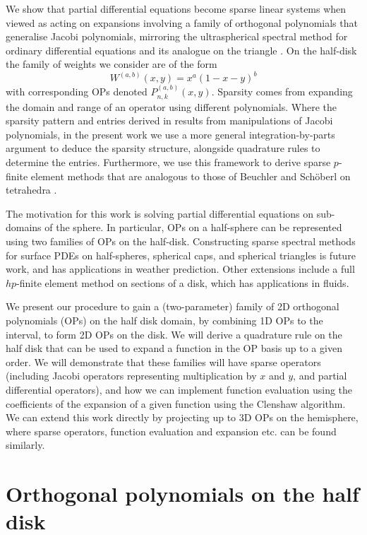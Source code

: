 \documentclass[11pt, oneside]{article}   	%
\begin{document}
We show that partial differential equations become sparse linear systems when viewed as acting on expansions involving a family of orthogonal polynomials that  generalise Jacobi polynomials, mirroring the ultraspherical spectral method for ordinary differential equations \cite{SOATUltraspherical} and its analogue on the triangle \cite{SOATGVTriangle}.  On the half-disk the family of weights we consider are of the form
$$
W^{(a,b)}(x,y) = x^a (1-x-y)^b
$$
with corresponding OPs denoted $P_{n,k}^{(a,b)}(x,y)$. Sparsity comes from expanding the domain and range of an operator  using different polynomials. Where the sparsity pattern and entries derived in \cite{SOATGVTriangleRecurrence,SOATGVTriangle}  results from manipulations of Jacobi polynomials, in the present work we use a more general integration-by-parts argument to deduce the sparsity structure, alongside quadrature rules to determine the entries.  Furthermore, we use this framework to derive sparse $p$-finite element methods that are analogous to those of Beuchler and Sch\"oberl on tetrahedra \cite{TriangleFEM}. 

The motivation for this work is solving partial differential equations on sub-domains of the sphere. In particular, OPs on a half-sphere can be represented using two families of OPs on the half-disk. Constructing sparse spectral methods for surface PDEs on half-spheres, spherical caps, and spherical triangles is future work, and has applications in weather prediction. Other extensions include a full $hp$-finite element method on sections of a disk, which has applications in fluids. 

  

 We present our procedure  to gain a (two-parameter) family of 2D orthogonal polynomials (OPs) on the half disk domain, by combining 1D OPs to the interval, to form 2D OPs on the disk. We will derive a quadrature rule on the half disk that can be used to expand a function in the OP basis up to a given order. We will demonstrate that these families will have sparse operators (including Jacobi operators representing multiplication by $x$ and $y$, and partial differential operators), and how we can implement function evaluation using the coefficients of the expansion of a given function using the Clenshaw algorithm. We can extend this work directly by projecting up to 3D OPs on the hemisphere, where sparse operators, function evaluation and expansion etc. can be found similarly. 

\section{Orthogonal polynomials  on the half disk}
\end{document}
